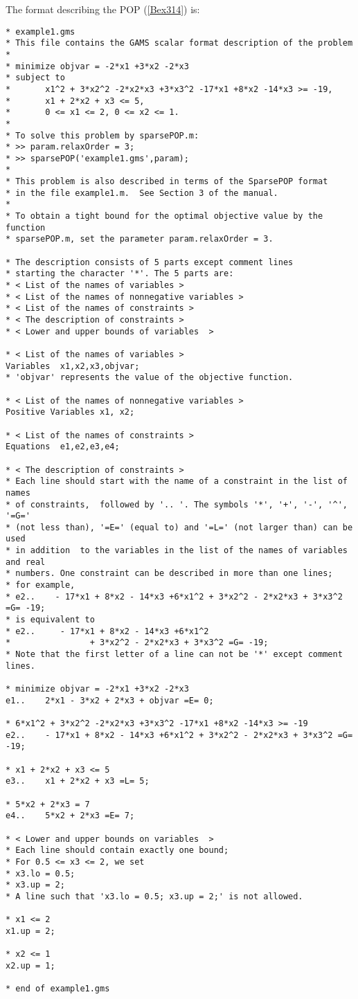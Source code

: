 The \GMS format describing the POP (\ref{Bex314})  is: 
\begin{verbatim}
* example1.gms
* This file contains the GAMS scalar format description of the problem 
*
* minimize objvar = -2*x1 +3*x2 -2*x3
* subject to 
*       x1^2 + 3*x2^2 -2*x2*x3 +3*x3^2 -17*x1 +8*x2 -14*x3 >= -19, 
*       x1 + 2*x2 + x3 <= 5, 
*       0 <= x1 <= 2, 0 <= x2 <= 1. 
*
* To solve this problem by sparsePOP.m:
* >> param.relaxOrder = 3;
* >> sparsePOP('example1.gms',param); 
* 
* This problem is also described in terms of the SparsePOP format 
* in the file example1.m.  See Section 3 of the manual.
*
* To obtain a tight bound for the optimal objective value by the function
* sparsePOP.m, set the parameter param.relaxOrder = 3.

* The description consists of 5 parts except comment lines
* starting the character '*'. The 5 parts are:
* < List of the names of variables >
* < List of the names of nonnegative variables >
* < List of the names of constraints >
* < The description of constraints >
* < Lower and upper bounds of variables  >

* < List of the names of variables >
Variables  x1,x2,x3,objvar;
* 'objvar' represents the value of the objective function.

* < List of the names of nonnegative variables >
Positive Variables x1, x2;

* < List of the names of constraints >
Equations  e1,e2,e3,e4;

* < The description of constraints >
* Each line should start with the name of a constraint in the list of names
* of constraints,  followed by '.. '. The symbols '*', '+', '-', '^', '=G='
* (not less than), '=E=' (equal to) and '=L=' (not larger than) can be used 
* in addition  to the variables in the list of the names of variables and real 
* numbers. One constraint can be described in more than one lines; 
* for example, 
* e2..    - 17*x1 + 8*x2 - 14*x3 +6*x1^2 + 3*x2^2 - 2*x2*x3 + 3*x3^2 =G= -19;
* is equivalent to
* e2..     - 17*x1 + 8*x2 - 14*x3 +6*x1^2
*                + 3*x2^2 - 2*x2*x3 + 3*x3^2 =G= -19;
* Note that the first letter of a line can not be '*' except comment lines.

* minimize objvar = -2*x1 +3*x2 -2*x3
e1..    2*x1 - 3*x2 + 2*x3 + objvar =E= 0;

* 6*x1^2 + 3*x2^2 -2*x2*x3 +3*x3^2 -17*x1 +8*x2 -14*x3 >= -19
e2..    - 17*x1 + 8*x2 - 14*x3 +6*x1^2 + 3*x2^2 - 2*x2*x3 + 3*x3^2 =G= -19;

* x1 + 2*x2 + x3 <= 5
e3..    x1 + 2*x2 + x3 =L= 5;

* 5*x2 + 2*x3 = 7
e4..    5*x2 + 2*x3 =E= 7;

* < Lower and upper bounds on variables  >
* Each line should contain exactly one bound; 
* For 0.5 <= x3 <= 2, we set 
* x3.lo = 0.5; 
* x3.up = 2; 
* A line such that 'x3.lo = 0.5; x3.up = 2;' is not allowed.

* x1 <= 2
x1.up = 2;

* x2 <= 1
x2.up = 1;

* end of example1.gms
\end{verbatim}

